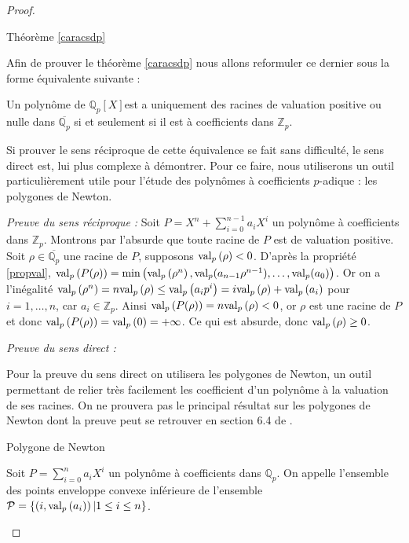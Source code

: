 \begin{proof} \hypertarget{caractères}{Théorème \ref{caracsdp} }
	
Afin de prouver le théorème \ref{caracsdp} nous allons reformuler ce dernier sous la forme équivalente suivante : 

	\begin{propriete}
		Un polynôme de $\mathbb{Q}_{p} [X] $est a uniquement des racines de valuation positive ou nulle dans $\overline{\mathbb{Q}_{p} }$ si et seulement si il est à coefficients dans $\mathbb{Z}_p$. 
	\end{propriete}
Si prouver le sens réciproque de cette équivalence se fait sans difficulté, le sens direct est, lui plus complexe à démontrer. Pour ce faire, nous utiliserons un outil particulièrement utile pour l'étude des polynômes à coefficients $p$-adique : les polygones de Newton.

\textit{Preuve du sens réciproque :} 
	Soit $P = X^n + \sum \limits_{i=0}^{n-1} a_{i} X^i $ un polynôme à coefficients dans $\mathbb{Z}_{p}$. 
	Montrons par l'absurde que toute racine de $P$ est de valuation positive. Soit $\rho \in \overline{\mathbb{Q}_{p} }$ une racine de $P$, supposons $\text{val}_p\left( \rho\right)<0$. D'après la propriété \ref{propval}, $\text{val}_p\left(P( \rho)\right) = \min \left( \text{val}_p\left( \rho^n \right), \text{val}_p(a_{n-1} \rho^{n-1}),\ldots, \text{val}_p(a_0) \right)$. Or on a l'inégalité $\text{val}_p\left( \rho^n\right) = n \text{val}_p\left( \rho\right)\le \text{val}_p\left(a_{i} p^{i} \right) = i\text{val}_p\left( \rho \right) + \text{val}_p\left(a_{i}\right)$ pour $i=1,\ldots,n$, car $a_i \in \mathbb{Z}_p$. Ainsi $\text{val}_p\left(P( \rho)\right) = n \text{val}_p\left( \rho\right) <0$, or $\rho$ est une racine de $P$ et donc $\text{val}_p\left( P( \rho) \right) = \text{val}_p\left(0\right) = +\infty$. Ce qui est absurde, donc $\text{val}_p\left( \rho\right) \ge 0$.

	\textit{Preuve du sens direct :} 

	Pour la preuve du sens direct on utilisera les polygones de Newton, un outil permettant de relier très facilement les coefficient d'un polynôme à la valuation de ses racines. On ne prouvera pas le principal résultat sur les polygones de Newton dont la preuve peut se retrouver en section 6.4 de \cite{gouvea_p-adic_2003} . 

\begin{definition}
	Polygone de Newton

Soit $P = \sum 	\limits_{i=0}^{n} a_i X^i$ un polynôme à coefficients dans $\mathbb{Q}_{p}$. On appelle  l'ensemble des points enveloppe convexe inférieure de l'ensemble  $\mathcal{P} = \{\left( i, \text{val}_p\left(a_{i}\right) \right)| 1\le i\le n \}$.
\end{definition}


\end{proof}
